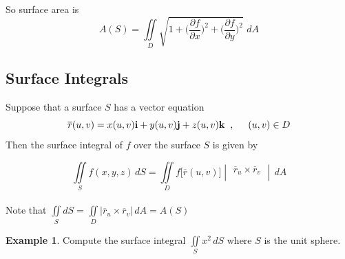 \documentclass[11pt,a4paper]{article}
\theoremstyle{definition}
\newtheorem{exa}[thm]{Example}
\begin{document}
So surface area is 
$$A(S)  = \iint\limits_D \sqrt{1 +\Bigg(\dfrac{\partial f}{\partial x}\Bigg)^2 + \Bigg(\dfrac{\partial f}{\partial y}\Bigg)^2 }\,\,dA$$


\pagebreak

{\color[wave]{485}\subsection{Surface Integrals}}
Suppose that a surface $S$ has a vector equation
$$\overline{r}(u,v) = x(u,v)\textbf{i} + y(u,v)\textbf{j} + z(u,v)\textbf{k}\hspace{0.2cm},\hspace{0.5cm} (u,v)\in D$$
Then the surface integral of $f$ over the surface $S$ is given by 

$$\iint\limits_S f(x,y,z)\,dS = \iint\limits_D f\big[\overline{r}(u,v)\big]\begin{vmatrix}
\overline{r}_u \times \overline{r}_v\\
\end{vmatrix}\,dA$$\\

Note that $\displaystyle{\iint\limits_S dS = \iint\limits_D\big|\overline{r}_u \times \overline{r}_v\big|\,dA =A(S)}$


\begin{exa}


Compute the surface integral $\displaystyle{\iint\limits_S x^2 \,dS}$ where $S$ is the unit sphere.
\end{exa}
\end{document}
